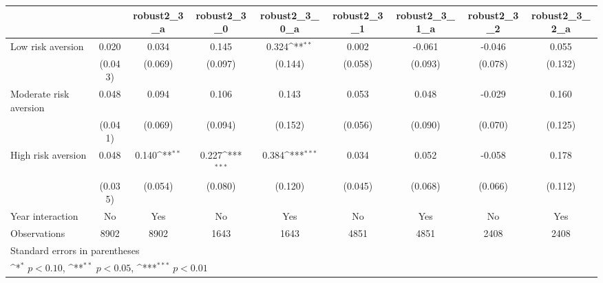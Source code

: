 {
\def\sym#1{\ifmmode^{#1}\else\(^{#1}\)\fi}
\begin{tabular}{l*{8}{c}}
\toprule
                &\multicolumn{1}{c}{}&\multicolumn{1}{c}{robust2\_3\_a}&\multicolumn{1}{c}{robust2\_3\_0}&\multicolumn{1}{c}{robust2\_3\_0\_a}&\multicolumn{1}{c}{robust2\_3\_1}&\multicolumn{1}{c}{robust2\_3\_1\_a}&\multicolumn{1}{c}{robust2\_3\_2}&\multicolumn{1}{c}{robust2\_3\_2\_a}\\
\midrule
Low risk aversion&    0.020         &    0.034         &    0.145         &    0.324\sym{**} &    0.002         &   -0.061         &   -0.046         &    0.055         \\
                &  (0.043)         &  (0.069)         &  (0.097)         &  (0.144)         &  (0.058)         &  (0.093)         &  (0.078)         &  (0.132)         \\
\addlinespace
Moderate risk aversion&    0.048         &    0.094         &    0.106         &    0.143         &    0.053         &    0.048         &   -0.029         &    0.160         \\
                &  (0.041)         &  (0.069)         &  (0.094)         &  (0.152)         &  (0.056)         &  (0.090)         &  (0.070)         &  (0.125)         \\
\addlinespace
High risk aversion&    0.048         &    0.140\sym{**} &    0.227\sym{***}&    0.384\sym{***}&    0.034         &    0.052         &   -0.058         &    0.178         \\
                &  (0.035)         &  (0.054)         &  (0.080)         &  (0.120)         &  (0.045)         &  (0.068)         &  (0.066)         &  (0.112)         \\
\addlinespace
Year interaction &       No         &      Yes         &       No         &      Yes         &       No         &      Yes         &       No         &      Yes         \\
\midrule
Observations    &     8902         &     8902         &     1643         &     1643         &     4851         &     4851         &     2408         &     2408         \\
\bottomrule
\multicolumn{9}{l}{\footnotesize Standard errors in parentheses}\\
\multicolumn{9}{l}{\footnotesize \sym{*} \(p<0.10\), \sym{**} \(p<0.05\), \sym{***} \(p<0.01\)}\\
\end{tabular}
}
